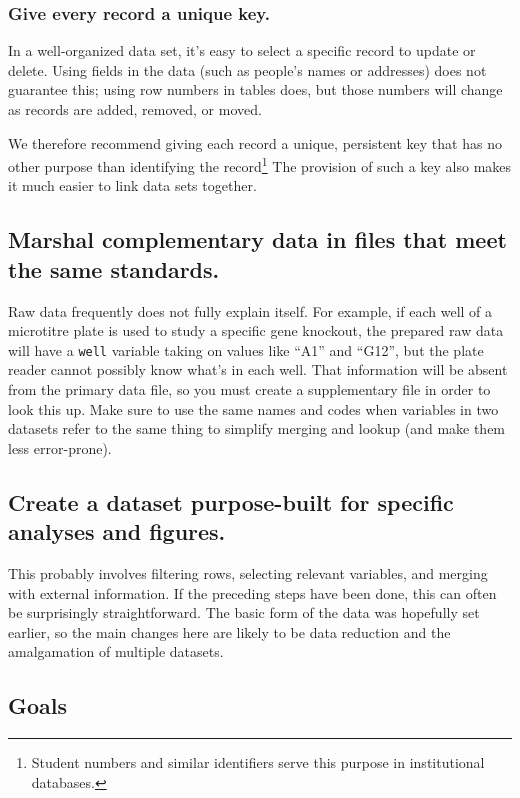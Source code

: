\documentclass[10pt]{article}
\begin{document}
\subsubsection*{Give every record a unique key.}

In a well-organized data set,
it's easy to select a specific record to update or delete.
Using fields in the data (such as people's names or addresses) does not guarantee this;
using row numbers in tables does,
but those numbers will change as records are added, removed, or moved.

We therefore recommend giving each record a unique, persistent key
that has no other purpose than identifying the record\footnote{Student
  numbers and similar identifiers serve this purpose in institutional
  databases.} The provision of such a key also makes it much easier to
link data sets together.

\subsection*{Marshal complementary data in files that meet the same standards.}

Raw data frequently does not fully explain itself. For example, if each
well of a microtitre plate is used to study a specific gene knockout,
the prepared raw data will have a \texttt{well} variable taking on
values like ``A1'' and ``G12'', but the plate reader cannot possibly
know what's in each well. That information will be absent from the
primary data file, so you must create a supplementary file in order to
look this up. Make sure to use the same names and codes when variables
in two datasets refer to the same thing to simplify merging and lookup
(and make them less error-prone).

\subsection*{Create a dataset purpose-built for specific analyses and figures.}

This probably involves filtering rows, selecting relevant variables, and
merging with external information. If the preceding steps have been
done, this can often be surprisingly straightforward. The basic form of
the data was hopefully set earlier, so the main changes here are likely
to be data reduction and the amalgamation of multiple datasets.

\subsection*{Goals}
\end{document}
